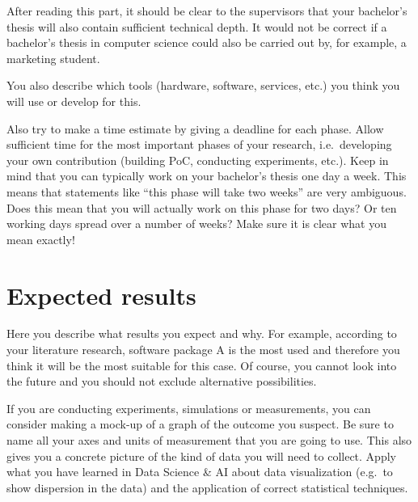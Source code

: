 \documentclass[english]{hogent-article}
\begin{document}
After reading this part, it should be clear to the supervisors that your bachelor's thesis will also contain sufficient technical depth. It would not be correct if a bachelor's thesis in computer science could also be carried out by, for example, a marketing student.

You also describe which tools (hardware, software, services, etc.) you think you will use or develop for this.

Also try to make a time estimate by giving a deadline for each phase. Allow sufficient time for the most important phases of your research, i.e.\ developing your own contribution (building PoC, conducting experiments, etc.). Keep in mind that you can typically work on your bachelor's thesis one day a week. This means that statements like ``this phase will take two weeks'' are very ambiguous. Does this mean that you will actually work on this phase for two days? Or ten working days spread over a number of weeks? Make sure it is clear what you mean exactly!

%
%
%

\section{Expected results}%
\label{sec:expected-results}


Here you describe what results you expect and why. For example, according to your literature research, software package A is the most used and therefore you think it will be the most suitable for this case. Of course, you cannot look into the future and you should not exclude alternative possibilities.

If you are conducting experiments, simulations or measurements, you can consider making a mock-up of a graph of the outcome you suspect. Be sure to name all your axes and units of measurement that you are going to use. This also gives you a concrete picture of the kind of data you will need to collect. Apply what you have learned in Data Science \& AI about data visualization (e.g.\ to show dispersion in the data) and the application of correct statistical techniques.
\end{document}
